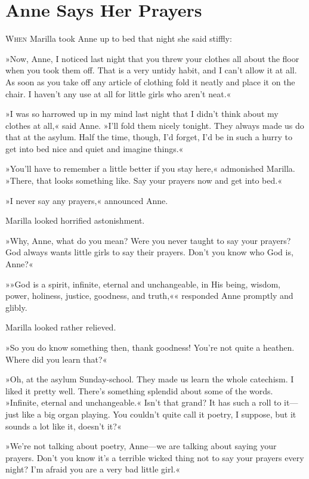 \chapter{Anne Says Her Prayers}

\lettrine[lines=4]{W}{hen} Marilla took Anne up to bed that night she said stiffly:

\zz
»Now, Anne, I noticed last night that you threw your clothes all about the floor when you took them off. That is a very untidy habit, and I can’t allow it at all. As soon as you take off any article of clothing fold it neatly and place it on the chair. I haven’t any use at all for little girls who aren’t neat.«

»I was so harrowed up in my mind last night that I didn’t think about my clothes at all,« said Anne. »I’ll fold them nicely tonight. They always made us do that at the asylum. Half the time, though, I’d forget, I’d be in such a hurry to get into bed nice and quiet and imagine things.«

»You’ll have to remember a little better if you stay here,« admonished Marilla. »There, that looks something like. Say your prayers now and get into bed.«

»I never say any prayers,« announced Anne.

Marilla looked horrified astonishment.

»Why, Anne, what do you mean? Were you never taught to say your prayers? God always wants little girls to say their prayers. Don’t you know who God is, Anne?«

»»God is a spirit, infinite, eternal and unchangeable, in His being, wisdom, power, holiness, justice, goodness, and truth,«« responded Anne promptly and glibly.

Marilla looked rather relieved.

»So you do know something then, thank goodness! You’re not quite a heathen. Where did you learn that?«

»Oh, at the asylum Sunday-school. They made us learn the whole catechism. I liked it pretty well. There’s something splendid about some of the words. »Infinite, eternal and unchangeable.« Isn’t that grand? It has such a roll to it—just like a big organ playing. You couldn’t quite call it poetry, I suppose, but it sounds a lot like it, doesn’t it?«

»We’re not talking about poetry, Anne—we are talking about saying your prayers. Don’t you know it’s a terrible wicked thing not to say your prayers every night? I’m afraid you are a very bad little girl.«


